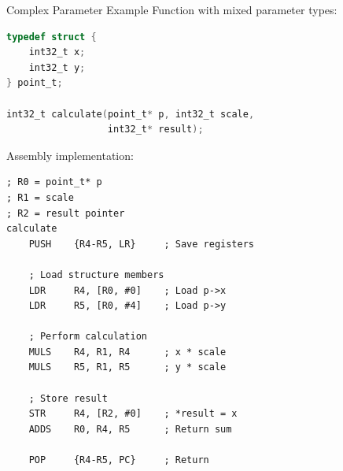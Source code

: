 \begin{example2}{Complex Parameter Example}
Function with mixed parameter types:
\begin{lstlisting}[language=C, style=base]
typedef struct {
    int32_t x;
    int32_t y;
} point_t;

int32_t calculate(point_t* p, int32_t scale, 
                  int32_t* result);
\end{lstlisting}

Assembly implementation:
\begin{lstlisting}[language=armasm, style=base]
; R0 = point_t* p
; R1 = scale
; R2 = result pointer
calculate
    PUSH    {R4-R5, LR}     ; Save registers
    
    ; Load structure members
    LDR     R4, [R0, #0]    ; Load p->x
    LDR     R5, [R0, #4]    ; Load p->y
    
    ; Perform calculation
    MULS    R4, R1, R4      ; x * scale
    MULS    R5, R1, R5      ; y * scale
    
    ; Store result
    STR     R4, [R2, #0]    ; *result = x
    ADDS    R0, R4, R5      ; Return sum
    
    POP     {R4-R5, PC}     ; Return
\end{lstlisting}
\end{example2}